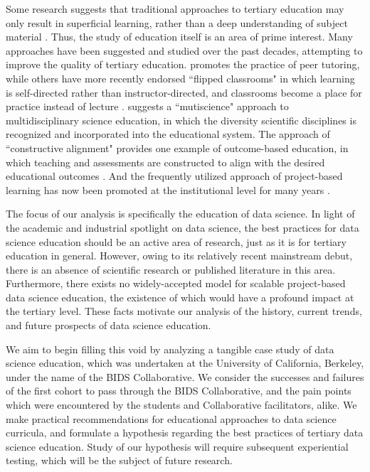 \documentclass[12pt]{article}
\begin{document}
Some research suggests that traditional approaches to tertiary education may only result in superficial learning, rather than a deep understanding of subject material \citep{Entwistle1992}.  Thus, the study of education itself is an area of prime interest.  Many approaches have been suggested and studied over the past decades, attempting to improve the quality of tertiary education.  \citet{Topping1996} promotes the practice of peer tutoring, while others have more recently endorsed ``flipped classrooms" in which learning is self-directed rather than instructor-directed, and classrooms become a place for practice instead of lecture \citep{Horn2013, Herreid2013}.  \citet{Ogawa1995} suggests a ``mutiscience" approach to multidisciplinary science education, in which the diversity scientific disciplines is recognized and incorporated into the educational system.  The approach of ``constructive alignment" provides one example of outcome-based education, in which teaching and assessments are constructed to align with the desired educational outcomes \citep{biggs2003aligning, biggs2011teaching}.  And the frequently utilized approach of project-based learning has now been promoted at the institutional level for many years \citep{Thomas2000, Krajcik2006}.

The focus of our analysis is specifically the education of data science. In light of the academic and industrial spotlight on data science, the best practices for data science education should be an active area of research, just as it is for tertiary education in general.  However, owing to its relatively recent mainstream debut, there is an absence of scientific research or published literature in this area.  Furthermore, there exists no widely-accepted model for scalable project-based data science education, the existence of which would have a profound impact at the tertiary level.  These facts motivate our analysis of the history, current trends, and future prospects of data science education.

We aim to begin filling this void by analyzing a tangible case study of data science education, which was undertaken at the University of California, Berkeley, under the name of the BIDS Collaborative. We consider the successes and failures of the first cohort to pass through the BIDS Collaborative, and the pain points which were encountered by the students and Collaborative facilitators, alike.  We make practical recommendations for educational approaches to data science curricula, and formulate a hypothesis regarding the best practices of tertiary data science education.  Study of our hypothesis will require subsequent experiential testing, which will be the subject of future research.
\end{document}
